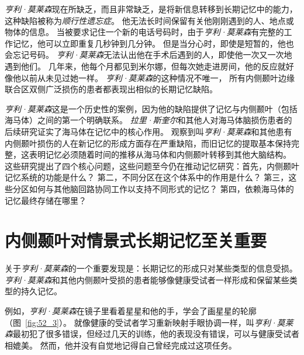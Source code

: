 \textit{亨利·莫莱森}现在所缺乏，而且非常缺乏，是将新信息转移到长期记忆中的能力，这种缺陷被称为\textit{顺行性遗忘症}。
他无法长时间保留有关他刚刚遇到的人、地点或物体的信息。
当被要求记住一个新的电话号码时，由于\textit{亨利·莫莱森}有完整的工作记忆，他可以立即重复几秒钟到几分钟。
但是当分心时，即使是短暂的，他也会忘记号码。
\textit{亨利·莫莱森}无法认出他在手术后遇到的人，即使他一次又一次地遇到他们。
几年来，他每个月都见到米尔娜，但每次她走进房间，他的反应就好像他以前从未见过她一样。
\textit{亨利·莫莱森}的这种情况不唯一，
所有内侧颞叶边缘联合区双侧广泛损伤的患者都表现出相似的长期记忆缺陷。


\textit{亨利·莫莱森}这是一个历史性的案例，因为他的缺陷提供了记忆与内侧颞叶（包括海马体）之间的第一个明确联系。
\textit{拉里·斯奎尔}和其他人对海马体脑损伤患者的后续研究证实了海马体在记忆中的核心作用。
观察到叫\textit{亨利·莫莱森}和其他患有内侧颞叶损伤的人在新记忆的形成方面存在严重缺陷，而旧记忆的提取基本保持完整，这表明记忆必须随着时间的推移从海马体和内侧颞叶转移到其他大脑结构。
这些研究提出了四个核心问题，这些问题至今仍在推动记忆研究：首先，内侧颞叶记忆系统的功能是什么？
第二，不同分区在这个体系中的作用是什么？
第三，这些分区如何与其他脑回路协同工作以支持不同形式的记忆？
第四，依赖海马体的记忆最终存储在哪里？



\section{内侧颞叶对情景式长期记忆至关重要}

关于\textit{亨利·莫莱森}的一个重要发现是：长期记忆的形成只对某些类型的信息受损。
\textit{亨利·莫莱森}和其他内侧颞叶受损的患者能够像健康受试者一样形成和保留某些类型的持久记忆。


例如，\textit{亨利·莫莱森}在镜子里看着星星和他的手，学会了画星星的轮廓（图~\ref{fig:52_3}）。
就像健康的受试者学习重新映射手眼协调一样，叫\textit{亨利·莫莱森}最初犯了很多错误，但经过几天的训练，他的表现没有错误，可以与健康受试者相媲美。
然而，他并没有自觉地记得自己曾经完成过这项任务。


